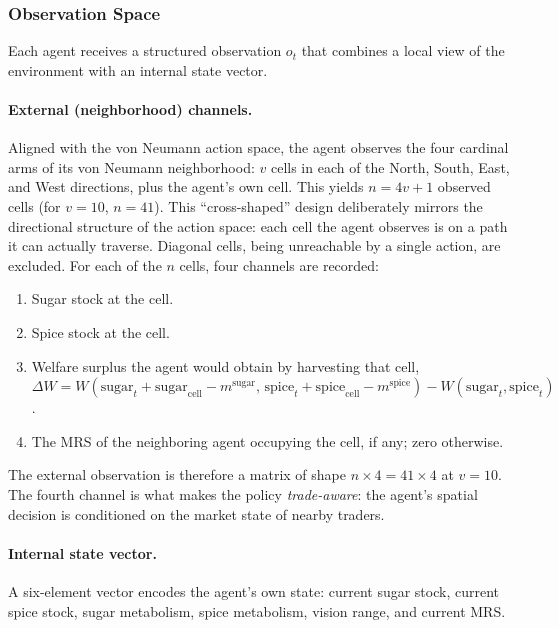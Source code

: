 \documentclass[pdflatex,sn-mathphys-num]{sn-jnl}%
\theoremstyle{thmstyleone}%
\theoremstyle{thmstyletwo}%
\theoremstyle{thmstylethree}%
\begin{document}
\subsubsection{Observation Space}
\label{sec:obs}
Each agent receives a structured observation $o_t$ that combines a local view of the environment with an internal state vector.

\paragraph{External (neighborhood) channels.}
Aligned with the von Neumann action space, the agent observes the four cardinal arms of its von Neumann neighborhood: $v$ cells in each of the North, South, East, and West directions, plus the agent's own cell.  
This yields $n = 4v + 1$ observed cells (for $v = 10$, $n = 41$).  
This ``cross-shaped'' design deliberately mirrors the directional structure of the action space: each cell the agent observes is on a path it can actually traverse.  
Diagonal cells, being unreachable by a single action, are excluded.  
For each of the $n$ cells, four channels are recorded:
\begin{enumerate}
    \item Sugar stock at the cell.
    \item Spice stock at the cell.
    \item Welfare surplus the agent would obtain by harvesting that cell, $\Delta W = W(\text{sugar}_t + \text{sugar}_{\text{cell}} - m^{\text{sugar}},\, \text{spice}_t + \text{spice}_{\text{cell}} - m^{\text{spice}}) - W(\text{sugar}_t, \text{spice}_t)$.
    \item The MRS of the neighboring agent occupying the cell, if any; zero otherwise.
\end{enumerate}
The external observation is therefore a matrix of shape $n \times 4 = 41 \times 4$ at $v = 10$.  
The fourth channel is what makes the policy \emph{trade-aware}: the agent's spatial decision is conditioned on the market state of nearby traders.

\paragraph{Internal state vector.}
A six-element vector encodes the agent's own state: current sugar stock, current spice stock, sugar metabolism, spice metabolism, vision range, and current MRS.
\end{document}
